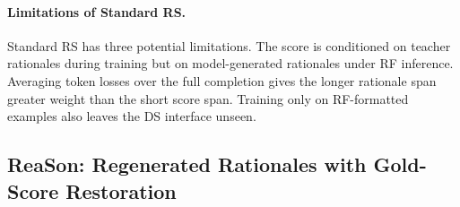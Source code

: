 \paragraph{Limitations of Standard RS.}
Standard RS has three potential limitations. The score is conditioned on
teacher rationales during training but on model-generated rationales under
RF inference. Averaging token losses over the full completion gives the
longer rationale span greater weight than the short score span. Training
only on RF-formatted examples also leaves the DS interface unseen.


\subsection{ReaSon: Regenerated Rationales with Gold-Score Restoration}

